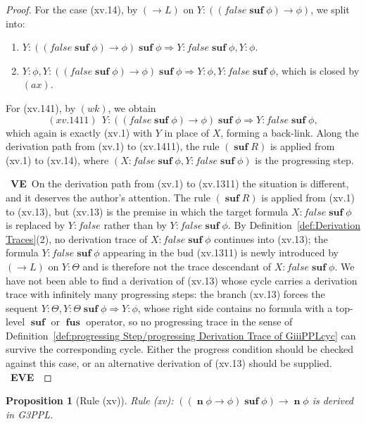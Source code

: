 \documentclass[manuscript,screen]{acmart}
\newtheorem{prop}{Proposition}[section]
\newcommand{\false}[0]{\mathit{false}}
\newcommand{\GiiiPPLcyc}[0]{\mbox{G3PPL}}
\DeclareMathOperator{\osuf}{\mathbf{suf}}
\DeclareMathOperator{\ofus}{\mathbf{fus}}
\DeclareMathOperator{\nxt}{\mathbf{n}}
\newcommand{\A}[1]{\mbox{ \textbf{#1} }}
\newcommand{\EMO}{\A{EMO}}
\newcommand{\VE}{\A{VE}}
\newcommand{\EVE}{\A{EVE}}
\begin{document}
\begin{proof}
For the case (xv.14), by $(\to L)$ on $Y : ((\false\osuf\phi)\to \phi)$, we split into:
\begin{enumerate}
    \item[(xv.141)] $Y : ((\false\osuf\phi)\to \phi)\osuf\phi\Rightarrow Y : \false\osuf\phi, Y : \phi$. 
    \item[(xv.142)] $Y : \phi, Y : ((\false\osuf\phi)\to \phi)\osuf\phi\Rightarrow Y : \phi, Y : \false\osuf\phi$, which is closed by $(ax)$. 
\end{enumerate}
For (xv.141), by $(wk)$, we obtain
$$
(xv.1411)\ \ Y : ((\false\osuf\phi)\to \phi)\osuf\phi\Rightarrow Y : \false\osuf\phi, 
$$
which again is exactly (xv.1) with $Y$ in place of $X$, forming a back-link. 
Along the derivation path from (xv.1) to (xv.1411), the rule $(\osuf R)$ is applied from (xv.1) to (xv.14), where $(X : \false\osuf\phi, Y : \false\osuf\phi)$ is the progressing step. %

\ifx
\VE On the derivation path from (xv.1) to (xv.1311) the situation is different, and it deserves the author's attention. The rule $(\osuf R)$ is applied from (xv.1) to (xv.13), but (xv.13) is the premise in which the target formula $X : \false\osuf\phi$ is replaced by $Y : \false$ rather than by $Y : \false\osuf\phi$. By Definition~\ref{def:Derivation Traces}(2), no derivation trace of $X : \false\osuf\phi$ continues into (xv.13); the formula $Y : \false\osuf\phi$ appearing in the bud (xv.1311) is newly introduced by $(\to L)$ on $Y : \Theta$ and is therefore not the trace descendant of $X : \false\osuf\phi$. We have not been able to find a derivation of (xv.13) whose cycle carries a derivation trace with infinitely many progressing steps: the branch (xv.13) forces the sequent $Y : \Theta, Y : \Theta\osuf\phi\Rightarrow Y : \phi$, whose right side contains no formula with a top-level $\osuf$ or $\ofus$ operator, so no progressing trace in the sense of Definition~\ref{def:progressing Step/progressing Derivation Trace of GiiiPPLcyc} can survive the corresponding cycle. Either the progress condition should be checked against this case, or an alternative derivation of (xv.13) should be supplied. \EVE
\fi

\end{proof}
\fi

\begin{prop}[Rule (xv)]
    \label{prop:Rule (xv)}
Rule (xv): 
$((\nxt \phi\to \phi)\osuf \phi) \rightarrow \nxt \phi$
is derived in \GiiiPPLcyc. 
\end{prop}
\end{document}
